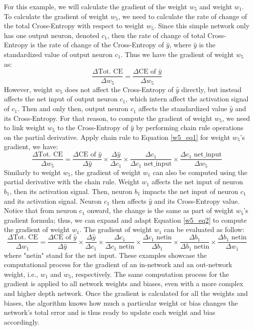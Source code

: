 For this example, we will calculate the gradient of the weight $w_5$ and weight $w_1$. To calculate the gradient of weight $w_5$, we need to calculate the rate of change of the total Cross-Entropy with respect to weight $w_5$. Since this simple network only has one output neuron, denoted $c_1$, then the rate of change of total Cross-Entropy is the rate of change of the Cross-Entropy of $\hat{y}$, where $\hat{y}$ is the standardized value of output neuron $c_1$. Thus we have the gradient of weight $w_5$ as:
%
\begin{equation} \label{w5_eq1}
    \frac{\Delta \text{Tot. CE}}{\Delta w_5}= \frac{\Delta \text{CE of }\hat{y}}{\Delta w_5}
\end{equation}
%
However, weight $w_5$ does not affect the Cross-Entropy of $\hat{y}$ directly, but instead affects the net input of output neuron $c_1$, which intern affect the activation signal of $c_1$. Then and only then, output neuron $c_1$ affects the standardized value $\hat{y}$ and its Cross-Entropy. For that reason, to compute the gradient of weight $w_5$, we need to link weight $w_5$ to the Cross-Entropy of $\hat{y}$ by performing chain rule operations on the partial derivative. Apply chain rule to Equation \ref{w5_eq1} for weight $w_5$'s gradient, we have:
%
\begin{equation} \label{w5_eq2}
    \frac{\Delta \text{Tot. CE}}{\Delta w_5}
    = \frac{\Delta \text{CE of }\hat{y}}{\Delta \hat{y}}
    \times \frac{\Delta \hat{y}}{\Delta c_1}
    \times \frac{\Delta c_1}{\Delta c_1 \text{ net\_input}}
    \times \frac{\Delta c_1 \text{ net\_input}}{\Delta w_5}
\end{equation}
%
Similarly to weight $w_5$, the gradient of weight $w_1$ can also be computed using the partial derivative with the chain rule. Weight $w_1$ affects the net input of neuron $b_1$, then its activation signal. Then, neuron $b_1$ impacts the net input of neuron $c_1$ and its activation signal. Neuron $c_1$ then affects $\hat{y}$ and its Cross-Entropy value. Notice that from neuron $c_1$ onward, the change is the same as part of weight $w_5$'s gradient formula; thus, we can expand and adapt Equation \ref{w5_eq2} to compute the gradient of weight $w_1$. The gradient of weight $w_1$ can be evaluated as follow:
%
\[
    \frac{\Delta \text{Tot. CE}}{\Delta w_1} = \frac{\Delta \text{CE of }\hat{y}}{\Delta \hat{y}} \times
    \frac{\Delta \hat{y}}{\Delta c_1} \times \frac{\Delta c_1}{\Delta c_1 \text{ netin}} \times \frac{\Delta c_1 \text{ netin}}{\Delta b_1}
    \times \frac{\Delta b_1}{\Delta b_1 \text{ netin}}
    \times \frac{\Delta b_1 \text{ netin}}{\Delta w_1}
\]
%
where "netin" stand for the net input. These examples showcase the computational process for the gradient of an in-network and an out-network weight, i.e., $w_1$ and $w_5$, respectively. The same computation process for the gradient is applied to all network weights and biases, even with a more complex and higher depth network. Once the gradient is calculated for all the weights and biases, the algorithm knows how much a particular weight or bias changes the network's total error and is thus ready to update each weight and bias accordingly.

